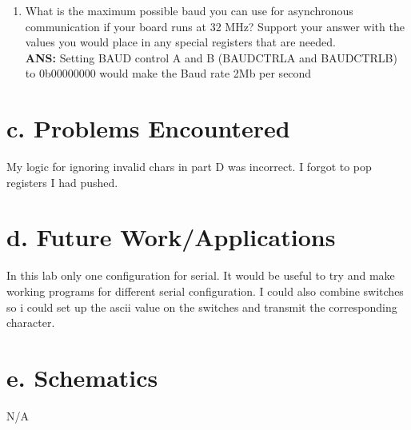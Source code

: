 \documentclass[11pt]{article}
\theoremstyle{plain}
\theoremstyle{definition}
\begin{document}
\begin{enumerate}[label={\arabic*)},font={\color{red}\bfseries}]
	\item What is the maximum possible baud you can use for asynchronous communication if your board runs at 32 MHz? Support your answer with the values you	would place in any special registers that are needed.
	\\[0.8ex]
	\textbf{ANS: } Setting BAUD control A and B (BAUDCTRLA and BAUDCTRLB) to 0b00000000 would make the Baud rate 2Mb per second
\end{enumerate}
%
%
\section*{c. Problems Encountered} 
My logic for ignoring invalid chars in part D was incorrect. I forgot to pop registers I had pushed.  
%
%
\section*{d. Future Work/Applications}
In this lab only one configuration for serial. It would be useful to try and make working programs for different serial configuration. I could also combine switches so i could set up the ascii value on the switches and transmit the corresponding character.    
%
%
\section*{e. Schematics}
N/A
%
%
\newpage
\end{document}
